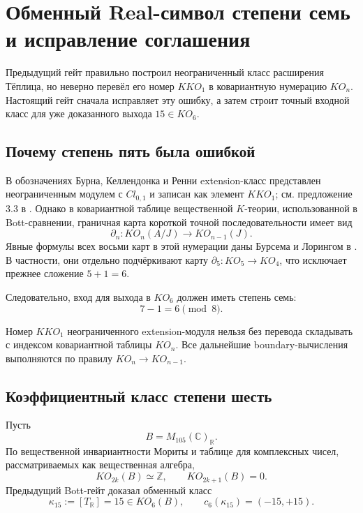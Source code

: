 \chapter{Обменный Real-символ степени семь и исправление соглашения}

Предыдущий гейт правильно построил неограниченный класс расширения
Тёплица, но неверно перевёл его номер $KKO_1$ в ковариантную нумерацию
$KO_n$. Настоящий гейт сначала исправляет эту ошибку, а затем строит
точный входной класс для уже доказанного выхода $15\in KO_6$.

\section{Почему степень пять была ошибкой}

В обозначениях Бурна, Келлендонка и Ренни extension-класс представлен
неограниченным модулем с $Cl_{0,1}$ и записан как элемент $KKO_1$;
см. предложение 3.3 в . Однако в ковариантной
таблице вещественной $K$-теории, использованной в Bott-сравнении,
граничная карта короткой точной последовательности имеет вид
\begin{equation}
 \partial_n:KO_n(A/J)\longrightarrow KO_{n-1}(J).
 \label{eq:v5-ko7-boundary-convention}
\end{equation}
Явные формулы всех восьми карт в этой нумерации даны Бурсема и Лорингом
в . В частности, они отдельно подчёркивают карту
$\partial_5:KO_5\to KO_4$, что исключает прежнее сложение $5+1=6$.

Следовательно, вход для выхода в $KO_6$ должен иметь степень семь:
\begin{equation}
 \boxed{7-1=6\pmod 8.}
 \label{eq:v5-ko7-correct-degree}
\end{equation}

\begin{nogocriterion}
Номер $KKO_1$ неограниченного extension-модуля нельзя без перевода
складывать с индексом ковариантной таблицы $KO_n$. Все дальнейшие
boundary-вычисления выполняются по правилу
$KO_n\to KO_{n-1}$.
\end{nogocriterion}

\section{Коэффициентный класс степени шесть}

Пусть
\begin{equation}
 B=M_{105}(\mathbb C)_{\mathbb R}.
\end{equation}
По вещественной инвариантности Мориты и таблице для комплексных чисел,
рассматриваемых как вещественная алгебра,
\begin{equation}
 KO_{2k}(B)\simeq\mathbb Z,
 \qquad
 KO_{2k+1}(B)=0.
 \label{eq:v5-ko7-coefficient-table}
\end{equation}
Предыдущий Bott-гейт доказал обменный класс
\begin{equation}
 \kappa_{15}:=[T_{\mathbb R}]=15\in KO_6(B),
 \qquad
 c_6(\kappa_{15})=(-15,+15).
 \label{eq:v5-ko7-coefficient-fifteen}
\end{equation}

